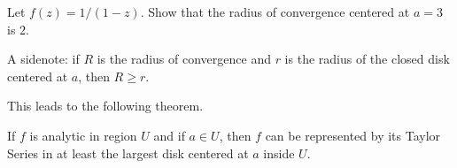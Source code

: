 \begin{exercise}
    Let $f(z) = 1/(1-z)$.  Show that the radius 
    of convergence centered at $a=3$ is $2$.
\end{exercise}

A sidenote: if $R$ is the 
radius of convergence and
$r$ is the radius of the closed
disk centered at $a$, then
$R \ge r$.

\noindent
This leads to the following theorem.

\begin{theorem}
    If $f$ is analytic in region $U$ and if $a \in U$, 
    then $f$ can be represented by its Taylor Series
    in at least the largest disk centered at $a$ inside $U$.
\end{theorem}





